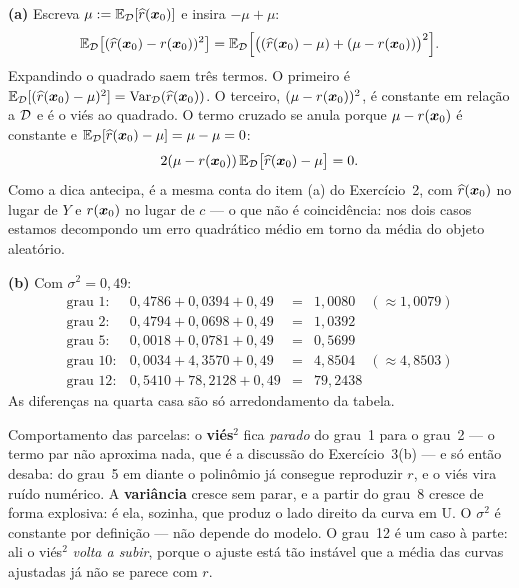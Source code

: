 \documentclass[11pt,a4paper]{article}
\begin{document}
\begin{solucao}
\textbf{(a)} Escreva $\mu:=\mathbb{E}_{\mathcal{D}}[\widehat{r}(\bm{x}_0)]$ e insira $-\mu+\mu$:
\[
  \mathbb{E}_{\mathcal{D}}\big[(\widehat{r}(\bm{x}_0)-r(\bm{x}_0))^2\big]
  = \mathbb{E}_{\mathcal{D}}\Big[\big((\widehat{r}(\bm{x}_0)-\mu) + (\mu-r(\bm{x}_0))\big)^2\Big].
\]
Expandindo o quadrado saem três termos. O primeiro é
$\mathbb{E}_{\mathcal{D}}[(\widehat{r}(\bm{x}_0)-\mu)^2]=\operatorname{Var}_{\mathcal{D}}(\widehat{r}(\bm{x}_0))$. O terceiro,
$(\mu-r(\bm{x}_0))^2$, é constante em relação a $\mathcal{D}$ e é o viés ao quadrado. O
termo cruzado se anula porque $\mu-r(\bm{x}_0)$ é constante e
$\mathbb{E}_{\mathcal{D}}[\widehat{r}(\bm{x}_0)-\mu]=\mu-\mu=0$:
\[
  2(\mu-r(\bm{x}_0))\,\mathbb{E}_{\mathcal{D}}\big[\widehat{r}(\bm{x}_0)-\mu\big] = 0.
\]
Como a dica antecipa, é a mesma conta do item (a) do Exercício~2, com
$\widehat{r}(\bm{x}_0)$ no lugar de $Y$ e $r(\bm{x}_0)$ no lugar de $c$ --- o que não é
coincidência: nos dois casos estamos decompondo um erro quadrático médio em torno
da média do objeto aleatório.

\smallskip
\textbf{(b)} Com $\sigma^2=0{,}49$:
\[
\begin{array}{lrcl}
  \text{grau } 1:  & 0{,}4786 + 0{,}0394 + 0{,}49  &=& 1{,}0080 \quad(\approx 1{,}0079)\\
  \text{grau } 2:  & 0{,}4794 + 0{,}0698 + 0{,}49  &=& 1{,}0392 \\
  \text{grau } 5:  & 0{,}0018 + 0{,}0781 + 0{,}49  &=& 0{,}5699 \\
  \text{grau } 10: & 0{,}0034 + 4{,}3570 + 0{,}49  &=& 4{,}8504 \quad(\approx 4{,}8503)\\
  \text{grau } 12: & 0{,}5410 + 78{,}2128 + 0{,}49 &=& 79{,}2438
\end{array}
\]
As diferenças na quarta casa são só arredondamento da tabela.

\smallskip
Comportamento das parcelas: o \textbf{viés$^2$} fica \emph{parado} do grau~1 para o
grau~2 --- o termo par não aproxima nada, que é a discussão do Exercício~3(b) --- e
só então desaba: do grau~5 em diante o polinômio já consegue reproduzir $r$, e o
viés vira ruído numérico.
A \textbf{variância} cresce sem parar, e a partir do grau~8 cresce de forma
explosiva: é ela, sozinha, que produz o lado direito da curva em U. O
\textbf{$\sigma^2$} é constante por definição --- não depende do modelo. O
grau~12 é um caso à parte: ali o viés$^2$ \emph{volta a subir}, porque o ajuste
está tão instável que a média das curvas ajustadas já não se parece com $r$.
\end{solucao}
\end{document}

